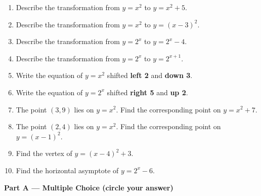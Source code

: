 \documentclass[12pt]{article}
\begin{document}
\vspace{0.3em}
\begin{enumerate}[label=\textbf{A\arabic*.},leftmargin=*,itemsep=10pt]
\item Describe the transformation from $y=x^2$ to $y=x^2+5$.\vspace{1.6cm}
\item Describe the transformation from $y=x^2$ to $y=(x-3)^2$.\vspace{1.6cm}
\item Describe the transformation from $y=2^x$ to $y=2^x-4$.\vspace{1.6cm}
\item Describe the transformation from $y=2^x$ to $y=2^{x+1}$.\vspace{1.6cm}
\item Write the equation of $y=x^2$ shifted \textbf{left 2} and \textbf{down 3}.\vspace{1.6cm}
\item Write the equation of $y=2^x$ shifted \textbf{right 5} and \textbf{up 2}.\vspace{1.6cm}
\item The point $(3,9)$ lies on $y=x^2$. Find the corresponding point on $y=x^2+7$.\vspace{1.6cm}
\item The point $(2,4)$ lies on $y=x^2$. Find the corresponding point on $y=(x-1)^2$.\vspace{1.6cm}
\item Find the vertex of $y=(x-4)^2+3$.\vspace{1.6cm}
\item Find the horizontal asymptote of $y=2^x-6$.\vspace{1.2cm}
\end{enumerate}

\newpage
\noindent\textbf{\large Part A --- Multiple Choice (circle your answer)}
\vspace{0.5em}
\end{document}
